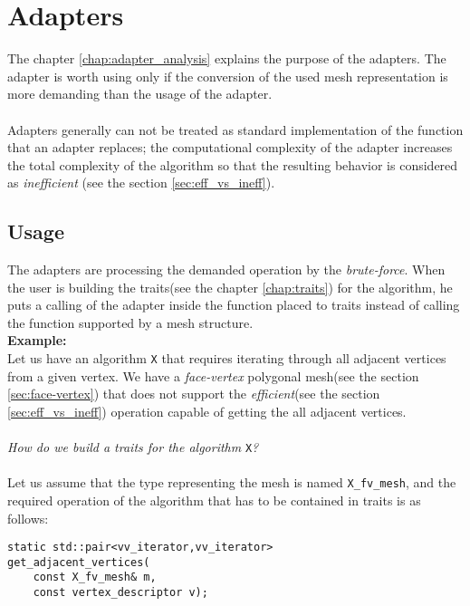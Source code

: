 \chapter{Adapters}

The chapter \ref{chap:adapter_analysis} explains the purpose of the adapters.
The adapter is worth using only if the conversion of the used mesh representation
is more demanding than the usage of the adapter.\\
\\Adapters generally can not
be treated as standard implementation of the function that an adapter replaces;
the computational complexity of the adapter increases the total complexity of the
algorithm so that the resulting behavior is considered as \emph{inefficient}
(see the section \ref{sec:eff_vs_ineff}).


\section{Usage}

The adapters are processing the demanded operation by the \emph{brute-force}. When
the user is building the traits(see the chapter \ref{chap:traits}) for the algorithm,
he puts a calling of the adapter inside the function placed to traits instead of
calling the function supported by a mesh structure.\\

\textbf{Example:}\\
Let us have an algorithm \texttt{X} that requires iterating through all adjacent vertices
from a given vertex. We have a \emph{face-vertex} polygonal mesh(see the section \ref{sec:face-vertex})
that does not support the \emph{efficient}(see the section \ref{sec:eff_vs_ineff}) operation
capable of getting the all adjacent vertices.\\
\\
\emph{How do we build a traits for the algorithm} \texttt{X}\emph{?}\\
\\
Let us assume that the type representing the mesh is named \texttt{X\_fv\_mesh}, and
the required operation of the algorithm that has to be contained in traits is as follows:

\begin{lstlisting}
static std::pair<vv_iterator,vv_iterator>
get_adjacent_vertices(
	const X_fv_mesh& m,
	const vertex_descriptor v);
\end{lstlisting}

